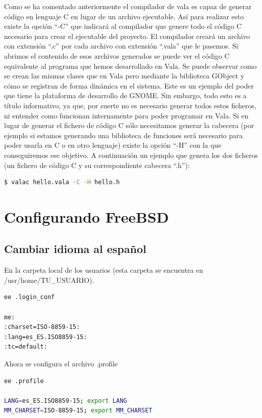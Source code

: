 \documentclass[12pt,twoside]{book}
\begin{document}
Como se ha comentado anteriormente el compilador de vala es capaz de generar código en lenguaje C en lugar de un archivo ejecutable. Así para realizar esto existe la opción ``-C'' que indicará al compilador que genere todo el código C necesario para crear el ejecutable del proyecto. El compilador creará un archivo con extensión ``.c'' por cada archivo con extensión ``.vala'' que le pasemos. Si abrimos el contenido de esos archivos generados se puede ver el código C equivalente al programa que hemos desarrollado en Vala. Se puede observar como se crean las mismas clases que en Vala pero mediante la biblioteca GObject y cómo se registran de forma dinámica en el sistema. Este es un ejemplo del poder que tiene la plataforma de desarrollo de GNOME. Sin embargo, todo esto es a título informativo, ya que, por suerte no es necesario generar todos estos ficheros, ni entender como funcionan internamente para poder programar en Vala. Si en lugar de generar el fichero de código C sólo necesitamos generar la cabecera (por ejemplo si estamos generando una biblioteca de funciones será necesario para poder usarla en C o en otro lenguaje) existe la opción ``-H'' con la que conseguiremos ese objetivo. A continuación un ejemplo que genera los dos ficheros (un fichero de código C y su correspondiente cabecera ``.h''):

\begin{lstlisting}[language=bash]
$ valac hello.vala -C -H hello.h
\end{lstlisting}
 
\chapter{Configurando FreeBSD}

\section{Cambiar idioma al español}
En la carpeta local de los usuarios (esta carpeta se encuentra en /usr/home/TU\_USUARIO).

\begin{lstlisting}[language=bash]
ee .login_conf

me:
:charset=ISO-8859-15:
:lang=es_ES.ISO8859-15:
:tc=default:
\end{lstlisting}



Ahora se configura el archivo .profile

\begin{lstlisting}[language=bash]
ee .profile

LANG=es_ES.ISO8859-15; export LANG
MM_CHARSET=ISO-8859-15; export MM_CHARSET
\end{lstlisting}
\end{document}
